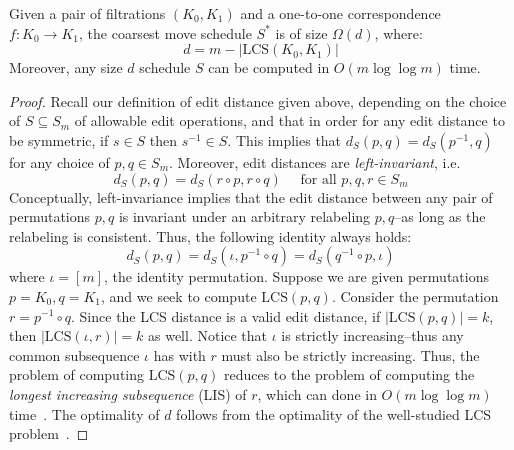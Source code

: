 \documentclass{siamart190516}
\begin{document}
\begin{proposition}
Given a pair of filtrations $(K_0, K_1)$ and a one-to-one correspondence $f: K_0 \to K_1$, the coarsest move schedule $S^\ast$ is of size $\Omega(d)$, where:
$$ d = m - \lvert \mathrm{LCS}(K_0, K_1) \rvert $$ 
Moreover, any size $d$ schedule $S$ can be computed in $O(m \log \log m)$ time. 
\end{proposition}
\begin{proof}
Recall our definition of  edit distance given above, 
depending on the choice of $S \subseteq S_m$ of allowable edit operations, and that in order for any edit distance to be symmetric, if $s \in S$ then $s^{-1} \in S$. This implies that $d_S(p,q) = d_S(p^{-1}, q)$ for any choice of  $p,q \in S_m$. 
Moreover, edit distances are \emph{left-invariant}, i.e.
\[
d_S(p,q) = d_S(r \circ p, r \circ q) \quad \text{ for all } p,q,r \in S_m
\]
Conceptually, left-invariance implies that the edit distance between any pair of permutations $p,q$ is invariant under an arbitrary relabeling $p,q$--as long as the relabeling is consistent. Thus, the following identity always holds: 
$$ d_S(p,q) = d_S(\iota, p^{-1} \circ q) = d_S(q^{-1} \circ p, \iota) $$
where $\iota = [m]$, the identity permutation. Suppose we are given permutations $p = K_0, q = K_1$, and we seek to compute $\mathrm{LCS}(p, q)$. Consider the permutation $r = p^{-1} \circ q$. Since the LCS distance is a valid edit distance, if $\lvert \mathrm{LCS}(p, q) \rvert = k$, then $\lvert \mathrm{LCS}(\iota, r) \rvert = k$ as well. Notice that $\iota$ is strictly increasing--thus any common subsequence $\iota$ has with $r$ must also be strictly increasing. Thus, the problem of computing $\mathrm{LCS}(p, q)$ reduces to the problem of computing the \emph{longest increasing subsequence} (LIS) of $r$, which can done in $O( m \log \log m)$ time~\cite{bespamyatnikh2000enumerating}. The optimality of $d$ follows from the optimality of the well-studied LCS problem~\cite{kumar1987linear}. 
\end{proof}
\end{document}
